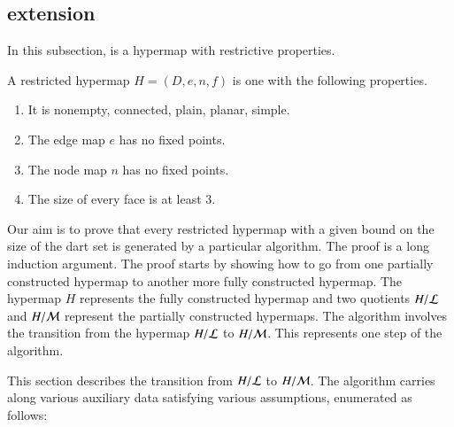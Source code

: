 \subsection{extension}\label{sec:face-insert}

In this subsection,  is a hypermap with restrictive properties.

\begin{definition}[restricted]\label{def:restricted}
A restricted hypermap $H = (D,e,n,f)$ is one with the following properties.
    \begin{enumerate}
        \item It is nonempty, connected, plain, planar, simple.
        \item The edge map $e$ has no fixed points.
        \item The node map $n$ has no fixed points.
        \item The size of every face is at least $3$.
    \end{enumerate}
\end{definition}


Our aim is to prove that every restricted hypermap with a given bound on the size of the dart set is generated by a particular algorithm.  The proof is a long induction argument.  The proof starts by showing how to go from one partially constructed hypermap to another more fully constructed hypermap.  The hypermap $H$ represents the fully constructed hypermap and two quotients $H/{\cal L}$ and $H/{\cal M}$ represent the partially constructed hypermaps.  The algorithm involves the transition from the hypermap $H/{\cal L}$ to $H/{\cal M}$.  This represents one step of the algorithm.

This section describes the transition from $H/{\cal L}$ to $H/{\cal M}$.  The algorithm carries along various auxiliary data satisfying various assumptions, enumerated as follows:

